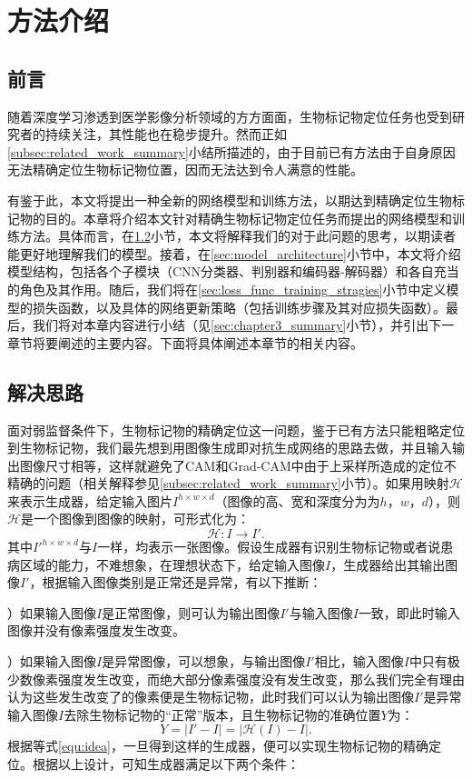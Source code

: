 \chapter{方法介绍}\label{sec:method}
\section{前言}
随着深度学习渗透到医学影像分析领域的方方面面，生物标记物定位任务也受到研究者的持续关注，其性能也在稳步提升。然而正如\ref{subsec:related_work_summary}小结所描述的，由于目前已有方法由于自身原因无法精确定位生物标记物位置，因而无法达到令人满意的性能。

有鉴于此，本文将提出一种全新的网络模型和训练方法，以期达到精确定位生物标记物的目的。本章将介绍本文针对精确生物标记物定位任务而提出的网络模型和训练方法。具体而言，在\ref{sec:idea_thinking}小节，本文将解释我们的对于此问题的思考，以期读者能更好地理解我们的模型。接着，在\ref{sec:model_architecture}小节中，本文将介绍模型结构，包括各个子模块（CNN分类器、判别器和编码器-解码器）和各自充当的角色及其作用。随后，我们将在\ref{sec:loss_func_training_stragies}小节中定义模型的损失函数，以及具体的网络更新策略（包括训练步骤及其对应损失函数）。最后，我们将对本章内容进行小结（见\ref{sec:chapter3_summary}小节），并引出下一章节将要阐述的主要内容。下面将具体阐述本章节的相关内容。
\section{解决思路}\label{sec:idea_thinking}
面对弱监督条件下，生物标记物的精确定位这一问题，鉴于已有方法只能粗略定位到生物标记物，我们最先想到用图像生成即对抗生成网络的思路去做，并且输入输出图像尺寸相等，这样就避免了CAM和Grad-CAM中由于上采样所造成的定位不精确的问题（相关解释参见\ref{subsec:related_work_summary}小节）。如果用映射$\mathcal{H}$来表示生成器，给定输入图片$I^{h\times w\times d}$（图像的高、宽和深度分为为$h$，$w$，$d$），则$\mathcal{H}$是一个图像到图像的映射，可形式化为：
\begin{equation*}
\mathcal{H}: I \to I'.
\end{equation*}
其中$I'^{h\times w\times d}$与$I$一样，均表示一张图像。假设生成器有识别生物标记物或者说患病区域的能力，不难想象，在理想状态下，给定输入图像$I$，生成器给出其输出图像$I'$，根据输入图像类别是正常还是异常，有以下推断：

）如果输入图像$I$是正常图像，则可认为输出图像$I'$与输入图像$I$一致，即此时输入图像并没有像素强度发生改变。

）如果输入图像$I$是异常图像，可以想象，与输出图像$I'$相比，输入图像$I$中只有极少数像素强度发生改变，而绝大部分像素强度没有发生改变，那么我们完全有理由认为这些发生改变了的像素便是生物标记物，此时我们可以认为输出图像$I'$是异常输入图像$I$去除生物标记物的“正常”版本，且生物标记物的准确位置$Y$为：
\begin{equation}\label{equ:idea}
Y=|I'-I|=|\mathcal{H}(I) - I|.
\end{equation}
\noindent 根据等式\ref{equ:idea}，一旦得到这样的生成器，便可以实现生物标记物的精确定位。根据以上设计，可知生成器满足以下两个条件：

